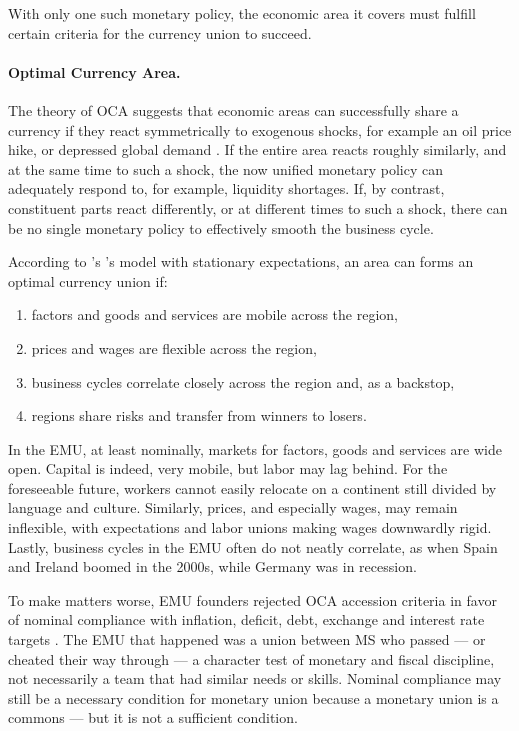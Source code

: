 \documentclass[11pt,a4paper,oneside]{article}
\begin{document}
With only one such monetary policy, the economic area it covers must fulfill certain criteria for the currency union to succeed.

\paragraph{Optimal Currency Area.}  \label{sec:OCA} The theory of \gls{OCA} suggests that economic areas can successfully share a currency if they react symmetrically to exogenous shocks, for example an oil price hike, or depressed global demand \citep{Mundell1961}.
If the entire area reacts roughly similarly, and at the same time to such a shock, the now unified monetary policy can adequately respond to, for example, liquidity shortages.
If, by contrast, constituent parts react differently, or at different times to such a shock, there can be no single monetary policy to effectively smooth the business cycle.

According to \citeauthor{Mundell1961}'s \citeyearpar{Mundell1961}'s  model with stationary expectations, an area can forms an optimal currency union if:
\begin{enumerate}
	\item factors and goods and services are mobile across the region,
	\item prices and wages are flexible across the region,
	\item business cycles correlate closely across the region and, as a backstop,
	\item regions share risks and transfer from winners to losers.
\end{enumerate}

In the \gls{EMU}, at least nominally, markets for factors, goods and services are wide open.
Capital is indeed, very mobile, but labor may lag behind.
For the foreseeable future, workers cannot easily relocate on a continent still divided by language and culture.
Similarly, prices, and especially wages, may remain inflexible, with expectations and labor unions making wages downwardly rigid.
Lastly, business cycles in the \gls{EMU} often do not neatly correlate, as when Spain and Ireland boomed in the 2000s, while Germany was in recession.

To make matters worse, \gls{EMU} founders rejected \gls{OCA} accession criteria in favor of nominal compliance with inflation, deficit, debt, exchange and interest rate targets \citep[4]{Begg2008}.
The \gls{EMU} that happened was a union between \gls{MS} who passed --- or cheated their way through --- a character test of monetary and fiscal discipline, not necessarily a team that had similar needs or skills.
Nominal compliance may still be a necessary condition for monetary union because a monetary union is a commons --- but it is not a sufficient condition.
\end{document}
